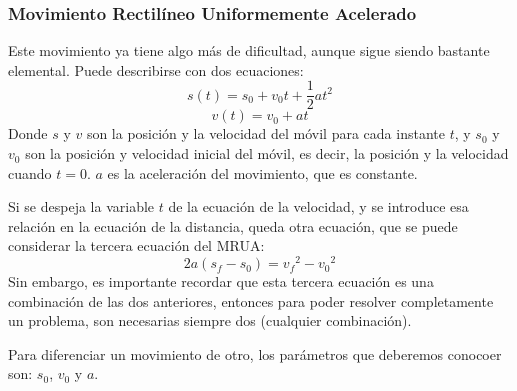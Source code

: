 \documentclass[ %
    oneside,    %
    10pt        %
]{apuntes} %
\begin{document}
\subsubsection{Movimiento Rectilíneo Uniformemente Acelerado}
Este movimiento ya tiene algo más de dificultad, aunque sigue siendo bastante elemental. Puede describirse con dos ecuaciones:
\[s(t) = s_0 + v_0 t + \frac1{2}a t^2\]
\[v(t) = v_0 + a t\]
Donde $s$ y $v$ son la posición y la velocidad del móvil para cada instante $t$, y $s_0$ y $v_0$ son la posición y velocidad inicial del móvil, es decir, la posición y la velocidad cuando $t  = 0$. $a$ es la aceleración del movimiento, que es constante.
\par Si se despeja la variable $t$ de la ecuación de la velocidad, y se introduce esa relación en la ecuación de la distancia, queda otra ecuación, que se puede considerar la tercera ecuación del MRUA:
\[2a(s_f - s_0) = {v_f}^2 - {v_0}^2\]
Sin embargo, es importante recordar que esta tercera ecuación es una combinación de las dos anteriores, entonces para poder resolver completamente un problema, son necesarias siempre dos (cualquier combinación).
\par Para diferenciar un movimiento de otro, los parámetros que deberemos conocoer son: $s_0$, $v_0$ y $a$.
\end{document}
